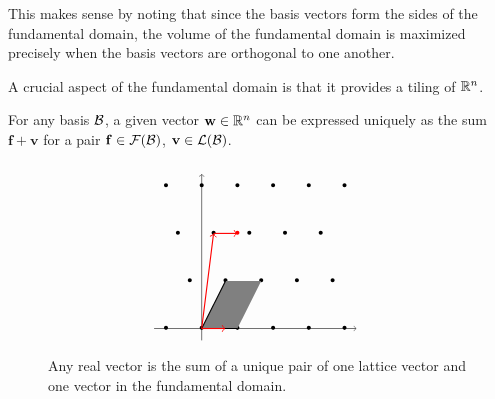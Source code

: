 \documentclass[a4paper,12pt]{article}
\begin{document}
This makes sense by noting that since the basis vectors form the sides of the fundamental domain, the volume of the fundamental domain is maximized precisely when the basis vectors are orthogonal to one another. 

A crucial aspect of the fundamental domain is that it provides a tiling of $\mathbb{R}^n$.

\begin{thm}
    For any basis $\mathcal{B}$, a given vector $\mathbf{w} \in \mathbb{R}^n$ can be expressed uniquely as the sum $\mathbf{f} + \mathbf{v}$ for a pair $\mathbf{f} \in \mathcal{F}(\mathcal{B})$, $\mathbf{v} \in \mathcal{L}(\mathcal{B})$.
    \begin{figure}[H]
        $$
            \begin{tikzpicture}[scale=0.3]
                \draw[->, thin] (-4,0)--(13,0) node [right] {}; 
                \draw[->, thin] (0,-1)--(0,13) node [above] {};
                \foreach \Point in {(-3,0), (0,0), (3,0), (6,0), (9,0), (12,0), (-1,4), (2,4), (5,4), (8,4), (11,4), (-2,8), (1,8), (4,8), (7,8), (10,8), (-3,12), (0,12), (3,12), (6,12), (9,12), (12,12)}{\node at \Point {\textbullet};}
                \path[fill=gray] (0,0)--(3,0)--(5,4)--(2,4)--(0,0);
                \node [red] at (3,8) {\textbullet};
                \draw[thick] (0,0)--(3,0);
                \draw[thick] (0,0)--(2,4);
                \draw[->, thick, red] (0,0)--(1,8);
                \draw[->, thick, red] (1,8)--(3,8);
                \draw[->, thick, red] (0,0)--(2,0);
            \end{tikzpicture}
        $$
        \caption{Any real vector is the sum of a unique pair of one lattice vector and one vector in the fundamental domain.}
    \end{figure}
\end{thm}
\end{document}
